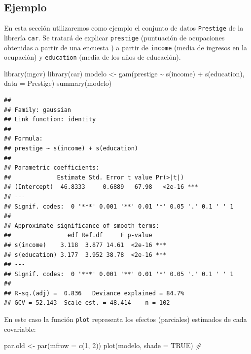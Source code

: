 \documentclass[
]{book}
\newenvironment{Shaded}{\begin{snugshade}}{\end{snugshade}}
\newcommand{\AttributeTok}[1]{\textcolor[rgb]{0.77,0.63,0.00}{#1}}
\newcommand{\CommentTok}[1]{\textcolor[rgb]{0.56,0.35,0.01}{\textit{#1}}}
\newcommand{\ConstantTok}[1]{\textcolor[rgb]{0.00,0.00,0.00}{#1}}
\newcommand{\DecValTok}[1]{\textcolor[rgb]{0.00,0.00,0.81}{#1}}
\newcommand{\FunctionTok}[1]{\textcolor[rgb]{0.00,0.00,0.00}{#1}}
\newcommand{\NormalTok}[1]{#1}
\newcommand{\OtherTok}[1]{\textcolor[rgb]{0.56,0.35,0.01}{#1}}
\newcommand{\SpecialCharTok}[1]{\textcolor[rgb]{0.00,0.00,0.00}{#1}}
\theoremstyle{break}
\begin{document}
\hypertarget{ejemplo-3}{%
\subsection{Ejemplo}\label{ejemplo-3}}

En esta sección utilizaremos como ejemplo el conjunto de datos \texttt{Prestige} de la librería \texttt{car}.
Se tratará de explicar \texttt{prestige} (puntuación de ocupaciones obtenidas a partir de una encuesta )
a partir de \texttt{income} (media de ingresos en la ocupación) y \texttt{education} (media de los años de
educación).

\begin{Shaded}
\begin{Highlighting}[]
\FunctionTok{library}\NormalTok{(mgcv)}
\FunctionTok{library}\NormalTok{(car)}
\NormalTok{modelo }\OtherTok{\textless{}{-}} \FunctionTok{gam}\NormalTok{(prestige }\SpecialCharTok{\textasciitilde{}} \FunctionTok{s}\NormalTok{(income) }\SpecialCharTok{+} \FunctionTok{s}\NormalTok{(education), }\AttributeTok{data =}\NormalTok{ Prestige)}
\FunctionTok{summary}\NormalTok{(modelo)}
\end{Highlighting}
\end{Shaded}

\begin{verbatim}
## 
## Family: gaussian 
## Link function: identity 
## 
## Formula:
## prestige ~ s(income) + s(education)
## 
## Parametric coefficients:
##             Estimate Std. Error t value Pr(>|t|)    
## (Intercept)  46.8333     0.6889   67.98   <2e-16 ***
## ---
## Signif. codes:  0 '***' 0.001 '**' 0.01 '*' 0.05 '.' 0.1 ' ' 1
## 
## Approximate significance of smooth terms:
##                edf Ref.df     F p-value    
## s(income)    3.118  3.877 14.61  <2e-16 ***
## s(education) 3.177  3.952 38.78  <2e-16 ***
## ---
## Signif. codes:  0 '***' 0.001 '**' 0.01 '*' 0.05 '.' 0.1 ' ' 1
## 
## R-sq.(adj) =  0.836   Deviance explained = 84.7%
## GCV = 52.143  Scale est. = 48.414    n = 102
\end{verbatim}

En este caso la función \texttt{plot} representa los efectos (parciales) estimados de cada covariable:

\begin{Shaded}
\begin{Highlighting}[]
\NormalTok{par.old }\OtherTok{\textless{}{-}} \FunctionTok{par}\NormalTok{(}\AttributeTok{mfrow =} \FunctionTok{c}\NormalTok{(}\DecValTok{1}\NormalTok{, }\DecValTok{2}\NormalTok{))}
\FunctionTok{plot}\NormalTok{(modelo, }\AttributeTok{shade =} \ConstantTok{TRUE}\NormalTok{) }\CommentTok{\# }
\end{Highlighting}
\end{Shaded}
\end{document}
